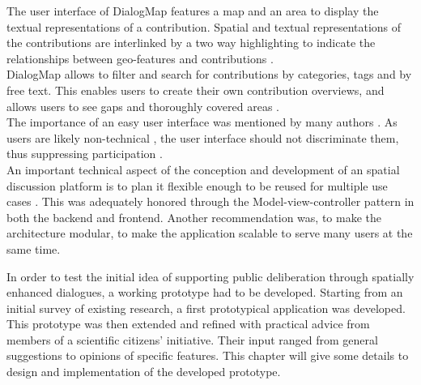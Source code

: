 The user interface of DialogMap features a map and an area to display the textual representations of a contribution. Spatial and textual representations of the contributions are interlinked by a two way highlighting to indicate the relationships between geo-features and contributions \cite{Cai2009_spatial_annotation_deliberation,Sidlar2009-AssessmentMapGeocollaborationTool}.\\
DialogMap allows to filter and search for contributions by categories, tags and by free text. This enables users to create their own contribution overviews\cite{Voss2004_Evolution_PGIS,you2009_participatory_map_based}, and allows users to see gaps and thoroughly covered areas \cite{Hopfer2007_Communication}.\\
The importance of an easy user interface was mentioned by many authors \cite{Rinner2009_Web2_argumap,Jankowski2005_community_based_pgis,Tang2005_PPGIS_discussion_forum,zhao2006geodf,you2009_participatory_map_based}. As users are likely non-technical \cite{Cai2009_spatial_annotation_deliberation}, the user interface should not discriminate them, thus suppressing participation \cite{Carver2001_PPGIS_Cyberdemocracy}.\\
An important technical aspect of the conception and development of an spatial discussion platform is to plan it flexible enough to be reused for multiple use cases \cite{Kessler2005_Conflict_Resolution,Kessler2005_ArgumentationMapPrototype,Sani2011_Scalable_Argumap}. This was adequately honored through the Model-view-controller pattern in both the backend and frontend. Another recommendation was, to make the architecture modular, to make the application scalable \cite{Sani2011_Scalable_Argumap} to serve many users at the same time.

In order to test the initial idea of supporting public deliberation through spatially enhanced dialogues, a working prototype had to be developed. Starting from an initial survey of existing research, a first prototypical application was developed. This prototype was then extended and refined with practical advice from members of a scientific citizens' initiative. Their input ranged from general suggestions to opinions of specific features. This chapter will give some details to design and implementation of the developed prototype.


